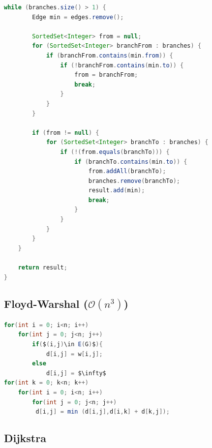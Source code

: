 \documentclass[10pt,a4paper,ngerman,oneside,]{article}
\begin{document}
\begin{multicols}{2}
\begin{lstlisting}[language=java]
	while (branches.size() > 1) {
		Edge min = edges.remove();

		SortedSet<Integer> from = null;
		for (SortedSet<Integer> branchFrom : branches) {
			if (branchFrom.contains(min.from)) {
				if (!branchFrom.contains(min.to)) {
					from = branchFrom;
					break;
				}
			}
		}

		if (from != null) {
			for (SortedSet<Integer> branchTo : branches) {
				if (!(from.equals(branchTo))) {
					if (branchTo.contains(min.to)) {
						from.addAll(branchTo);
						branches.remove(branchTo);
						result.add(min);
						break;
					}
				}
			}
		}
	}

	return result;
}		
\end{lstlisting}
\subsection{Floyd-Warshal ($\mathcal{O}(n^3)$)}
\begin{lstlisting}[language=java]
for(int i = 0; i<n; i++)
	for(int j = 0; j<n; j++) 
		if($(i,j)\in E(G)$){
			d[i,j] = w[i,j];
		else
			d[i,j] = $\infty$
for(int k = 0; k<n; k++)
	for(int i = 0; i<n; i++)
		for(int j = 0; j<n; j++) 
	     d[i,j] = min (d[i,j],d[i,k] + d[k,j]);
\end{lstlisting}
\subsection{Dijkstra}
		

\end{multicols}
\end{document}
